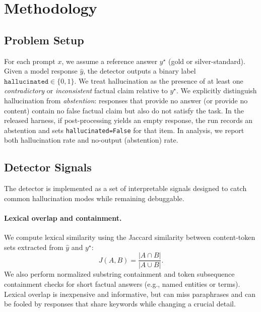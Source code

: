 \documentclass[11pt]{article}
\begin{document}
\section{Methodology}
\subsection{Problem Setup}
For each prompt $x$, we assume a reference answer $y^\star$ (gold or silver-standard). Given a model response $\hat{y}$, the detector outputs a binary label $\texttt{hallucinated} \in \{0,1\}$. We treat hallucination as the presence of at least one \emph{contradictory} or \emph{inconsistent} factual claim relative to $y^\star$. We explicitly distinguish hallucination from \emph{abstention}: responses that provide no answer (or provide no content) contain no false factual claim but also do not satisfy the task. In the released harness, if post-processing yields an empty response, the run records an abstention and sets \texttt{hallucinated=False} for that item. In analysis, we report both hallucination rate and no-output (abstention) rate.

\subsection{Detector Signals}
The detector is implemented as a set of interpretable signals designed to catch common hallucination modes while remaining debuggable.

\paragraph{Lexical overlap and containment.}
We compute lexical similarity using the Jaccard similarity between content-token sets extracted from $\hat{y}$ and $y^\star$:
\begin{equation}
J(A,B)=\frac{|A\cap B|}{|A\cup B|}.
\end{equation}
We also perform normalized substring containment and token subsequence containment checks for short factual answers (e.g., named entities or terms). Lexical overlap is inexpensive and informative, but can miss paraphrases and can be fooled by responses that share keywords while changing a crucial detail.
\end{document}
